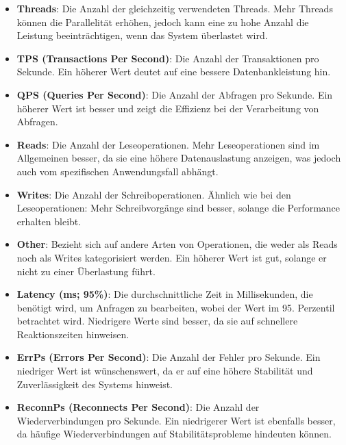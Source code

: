 \begin{itemize}
    \item \textbf{Threads}: Die Anzahl der gleichzeitig verwendeten Threads.
    Mehr Threads können die Parallelität erhöhen, jedoch kann eine zu hohe Anzahl
    die Leistung beeinträchtigen, wenn das System überlastet wird.
    \item \textbf{TPS (Transactions Per Second)}: Die Anzahl der Transaktionen pro Sekunde.
    Ein höherer Wert deutet auf eine bessere Datenbankleistung hin.
    \item \textbf{QPS (Queries Per Second)}: Die Anzahl der Abfragen pro Sekunde.
    Ein höherer Wert ist besser und zeigt die Effizienz bei der Verarbeitung von Abfragen.
    \item \textbf{Reads}: Die Anzahl der Leseoperationen.
    Mehr Leseoperationen sind im Allgemeinen besser, da sie eine höhere Datenauslastung anzeigen, was jedoch auch vom spezifischen Anwendungsfall abhängt.
    \item \textbf{Writes}: Die Anzahl der Schreiboperationen.
    Ähnlich wie bei den Leseoperationen: Mehr Schreibvorgänge sind besser, solange die Performance erhalten bleibt.
    \item \textbf{Other}: Bezieht sich auf andere Arten von Operationen, die weder als Reads noch als Writes kategorisiert werden.
    Ein höherer Wert ist gut, solange er nicht zu einer Überlastung führt.
    \item \textbf{Latency (ms; 95\%)}: Die durchschnittliche Zeit in Millisekunden, die benötigt wird, um Anfragen zu bearbeiten, wobei der Wert im 95. Perzentil betrachtet wird.
    Niedrigere Werte sind besser, da sie auf schnellere Reaktionszeiten hinweisen.
    \item \textbf{ErrPs (Errors Per Second)}: Die Anzahl der Fehler pro Sekunde.
    Ein niedriger Wert ist wünschenswert, da er auf eine höhere Stabilität und Zuverlässigkeit des Systems hinweist.
    \item \textbf{ReconnPs (Reconnects Per Second)}: Die Anzahl der Wiederverbindungen pro Sekunde.
    Ein niedrigerer Wert ist ebenfalls besser, da häufige Wiederverbindungen auf Stabilitätsprobleme hindeuten können.
\end{itemize}
